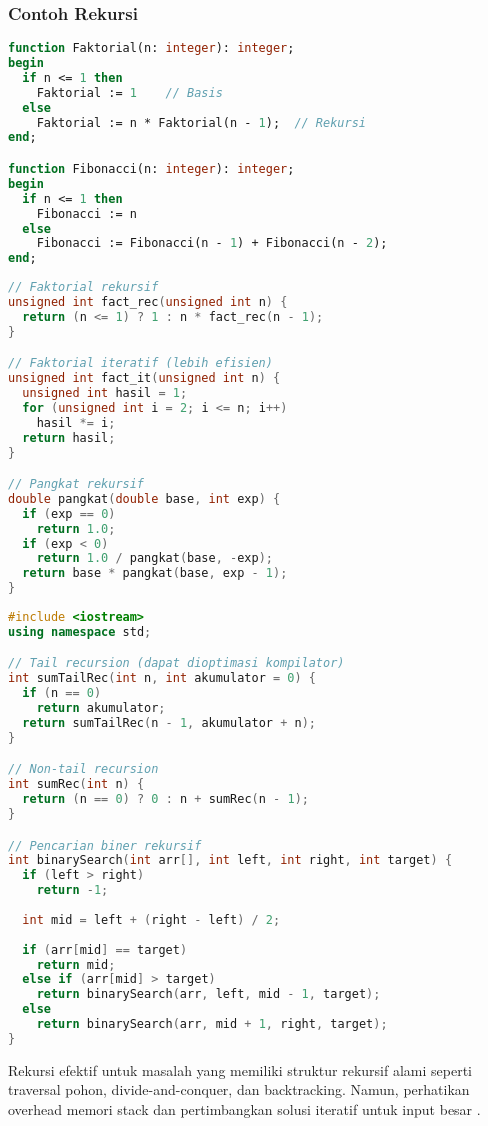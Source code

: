 \documentclass[../main.tex]{subfiles}
\begin{document}
\subsubsection{Contoh Rekursi}
\begin{lstlisting}[language=Pascal, caption={Fungsi rekursif (Pascal)}]
function Faktorial(n: integer): integer;
begin
  if n <= 1 then
    Faktorial := 1    // Basis
  else
    Faktorial := n * Faktorial(n - 1);  // Rekursi
end;

function Fibonacci(n: integer): integer;
begin
  if n <= 1 then
    Fibonacci := n
  else
    Fibonacci := Fibonacci(n - 1) + Fibonacci(n - 2);
end;
\end{lstlisting}

\begin{lstlisting}[language=C, caption={Fungsi rekursif vs iteratif (C)}]
// Faktorial rekursif
unsigned int fact_rec(unsigned int n) {
  return (n <= 1) ? 1 : n * fact_rec(n - 1);
}

// Faktorial iteratif (lebih efisien)
unsigned int fact_it(unsigned int n) {
  unsigned int hasil = 1;
  for (unsigned int i = 2; i <= n; i++)
    hasil *= i;
  return hasil;
}

// Pangkat rekursif
double pangkat(double base, int exp) {
  if (exp == 0)
    return 1.0;
  if (exp < 0)
    return 1.0 / pangkat(base, -exp);
  return base * pangkat(base, exp - 1);
}
\end{lstlisting}

\begin{lstlisting}[language=C++, caption={Rekursi dengan optimasi (C++)}]
#include <iostream>
using namespace std;

// Tail recursion (dapat dioptimasi kompilator)
int sumTailRec(int n, int akumulator = 0) {
  if (n == 0)
    return akumulator;
  return sumTailRec(n - 1, akumulator + n);
}

// Non-tail recursion
int sumRec(int n) {
  return (n == 0) ? 0 : n + sumRec(n - 1);
}

// Pencarian biner rekursif
int binarySearch(int arr[], int left, int right, int target) {
  if (left > right)
    return -1;
  
  int mid = left + (right - left) / 2;
  
  if (arr[mid] == target)
    return mid;
  else if (arr[mid] > target)
    return binarySearch(arr, left, mid - 1, target);
  else
    return binarySearch(arr, mid + 1, right, target);
}
\end{lstlisting}

Rekursi efektif untuk masalah yang memiliki struktur rekursif alami seperti traversal pohon, divide-and-conquer, dan backtracking. Namun, perhatikan overhead memori stack dan pertimbangkan solusi iteratif untuk input besar \parencite{cpp-reference,gnu-c-manual}.
\end{document}
